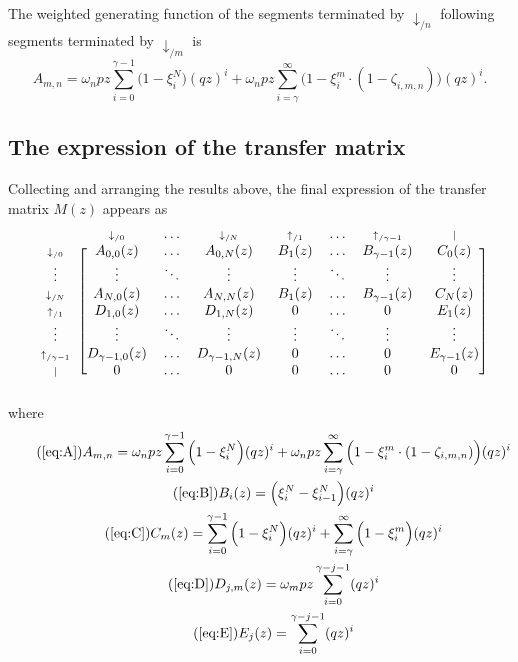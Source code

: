 \documentclass{article}
\newcommand{\dn}[1]{\scriptstyle{\downarrow_{/#1}}}
\newcommand{\up}[1]{\scriptstyle{\uparrow_{/#1}}}
\newcommand{\nd}{\scriptstyle{|}}
\begin{document}
The weighted generating function of the segments terminated by
$\downarrow_{/n}$ following segments terminated by $\downarrow_{/m}$ is
\begin{equation}
\label{eq:A}
A_{m,n} =
\omega_n pz \sum_{i=0}^{\gamma-1} \Big(1 - \xi_i^N \Big) (qz)^i + \omega_n
pz \sum_{i=\gamma}^\infty \Big(1 - \xi_i^m \cdot
(1- \zeta_{i,m,n}) \Big) (qz)^i.
\end{equation}

\subsection{The expression of the transfer matrix}
\label{sec:expression_of_M}

Collecting and arranging the results above, the final expression of the
transfer matrix $M(z)$ appears as
\begin{equation*}
\begin{blockarray}{cccccccc}
   & \dn{0} & \ldots & \dn{N} & \up{1} & \ldots & \up{\gamma-1} & \nd \\
\begin{block}{c[ccccccc]}
\dn{0} & A_{0,0}(z) & \ldots & A_{0,N}(z) & B_1(z) & \ldots &
    B_{\gamma-1}(z) & C_0(z) \\
\vdots & \vdots & \ddots & \vdots & \vdots & \ddots &
    \vdots & \vdots \\
\dn{N} & A_{N,0}(z) & \ldots & A_{N,N}(z) & B_1(z) & \ldots &
    B_{\gamma-1}(z) & C_N(z) \\
\up{1} & D_{1,0}(z) & \ldots & D_{1,N}(z) & 0 & \ldots & 0 & E_1(z) \\
\vdots & \vdots & \ddots & \vdots & \vdots & \ddots &
    \vdots & \vdots \\
\up{\gamma-1} & D_{\gamma-1,0}(z) & \ldots & D_{\gamma-1,N}(z) & 0 &
  \ldots & 0 & E_{\gamma-1}(z) \\
\nd & 0 & \ldots & 0 & 0 & \ldots & 0 & 0 \\
\end{block}
\end{blockarray}
\end{equation*}
where
\begin{gather}
\tag{\ref{eq:A}}
A_{m,n} =
\omega_n pz \sum_{i=0}^{\gamma-1} \Big(1 - \xi_i^N \Big) (qz)^i + \omega_n
pz \sum_{i=\gamma}^\infty \Big(1 - \xi_i^m \cdot
(1- \zeta_{i,m,n}) \Big) (qz)^i \\
\tag{\ref{eq:B}}
B_i(z) = \Big( \xi_i^N-\xi_{i-1}^N \Big) (qz)^i \\
\tag{\ref{eq:C}}
C_m(z) =
\sum_{i=0}^{\gamma-1} \Big(1 - \xi_i^N \Big) (qz)^i +
  \sum_{i=\gamma}^\infty \Big(1 - \xi_i^m \Big) (qz)^i \\
\tag{\ref{eq:D}}
D_{j,m}(z) = \omega_m pz \sum_{i=0}^{\gamma-j-1} (qz)^i \\
\tag{\ref{eq:E}}
E_j(z) = \sum_{i=0}^{\gamma-j-1} (qz)^i
\end{gather}
\end{document}

